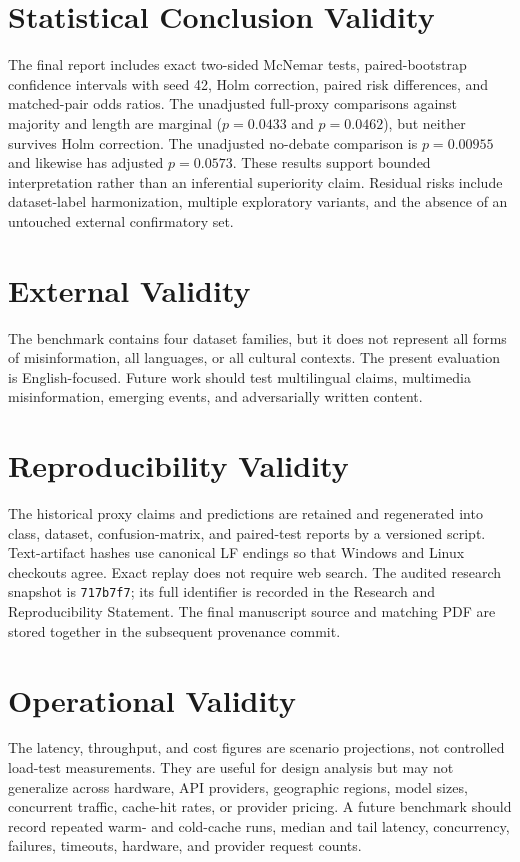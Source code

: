 \documentclass[12pt,a4paper,openany]{report}
\begin{document}
\section{Statistical Conclusion Validity}
The final report includes exact two-sided McNemar tests, paired-bootstrap confidence intervals with seed 42, Holm correction, paired risk differences, and matched-pair odds ratios. The unadjusted full-proxy comparisons against majority and length are marginal ($p=0.0433$ and $p=0.0462$), but neither survives Holm correction. The unadjusted no-debate comparison is $p=0.00955$ and likewise has adjusted $p=0.0573$. These results support bounded interpretation rather than an inferential superiority claim. Residual risks include dataset-label harmonization, multiple exploratory variants, and the absence of an untouched external confirmatory set.

\section{External Validity}
The benchmark contains four dataset families, but it does not represent all forms of misinformation, all languages, or all cultural contexts. The present evaluation is English-focused. Future work should test multilingual claims, multimedia misinformation, emerging events, and adversarially written content.

\section{Reproducibility Validity}
The historical proxy claims and predictions are retained and regenerated into
class, dataset, confusion-matrix, and paired-test reports by a versioned
script. Text-artifact hashes use canonical LF endings so that Windows and
Linux checkouts agree. Exact replay does not require web search. The audited
research snapshot is \texttt{717b7f7}; its full identifier is recorded in the
Research and Reproducibility Statement. The final manuscript source
and matching PDF are stored together in the subsequent provenance commit.

\section{Operational Validity}
The latency, throughput, and cost figures are scenario projections, not controlled load-test measurements. They are useful for design analysis but may not generalize across hardware, API providers, geographic regions, model sizes, concurrent traffic, cache-hit rates, or provider pricing. A future benchmark should record repeated warm- and cold-cache runs, median and tail latency, concurrency, failures, timeouts, hardware, and provider request counts.
\end{document}
